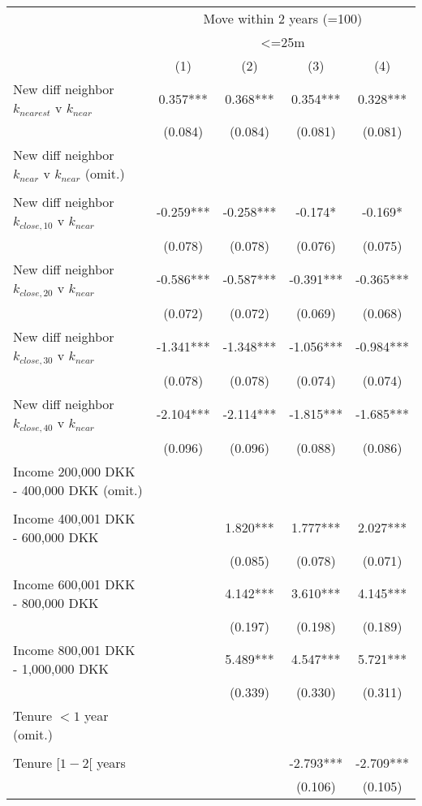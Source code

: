 \begin{tabular}{lcccc}
\toprule
 & \multicolumn{4}{c}{Move within 2 years (=100)} \\ 
\cmidrule(lr){2-5}
 & \multicolumn{4}{c}{<=25m} \\ 
\cmidrule(lr){2-5}
  & (1) & (2) & (3) & (4) \\ 
\midrule
New diff neighbor $k_{nearest}$ v $k_{near}$ & 0.357*** & 0.368*** & 0.354*** & 0.328*** \\ 
 & (0.084) & (0.084) & (0.081) & (0.081) \\ 
New diff neighbor $k_{near}$ v $k_{near}$ (omit.) &  &  &  &  \\ 
 &  &  &  &  \\ 
New diff neighbor $k_{close,10}$ v $k_{near}$ & -0.259*** & -0.258*** & -0.174* & -0.169* \\ 
 & (0.078) & (0.078) & (0.076) & (0.075) \\ 
New diff neighbor $k_{close,20}$ v $k_{near}$ & -0.586*** & -0.587*** & -0.391*** & -0.365*** \\ 
 & (0.072) & (0.072) & (0.069) & (0.068) \\ 
New diff neighbor $k_{close,30}$ v $k_{near}$ & -1.341*** & -1.348*** & -1.056*** & -0.984*** \\ 
 & (0.078) & (0.078) & (0.074) & (0.074) \\ 
New diff neighbor $k_{close,40}$ v $k_{near}$ & -2.104*** & -2.114*** & -1.815*** & -1.685*** \\ 
 & (0.096) & (0.096) & (0.088) & (0.086) \\ 
Income 200,000 DKK - 400,000 DKK (omit.) &  &  &  &  \\ 
 &  &  &  &  \\ 
Income 400,001 DKK - 600,000 DKK &  & 1.820*** & 1.777*** & 2.027*** \\ 
 &  & (0.085) & (0.078) & (0.071) \\ 
Income 600,001 DKK - 800,000 DKK &  & 4.142*** & 3.610*** & 4.145*** \\ 
 &  & (0.197) & (0.198) & (0.189) \\ 
Income 800,001 DKK - 1,000,000 DKK &  & 5.489*** & 4.547*** & 5.721*** \\ 
 &  & (0.339) & (0.330) & (0.311) \\ 
Tenure $<1$ year (omit.) &  &  &  &  \\ 
 &  &  &  &  \\ 
Tenure $[1-2[$ years &  &  & -2.793*** & -2.709*** \\ 
 &  &  & (0.106) & (0.105) \\ 

\end{tabular}
